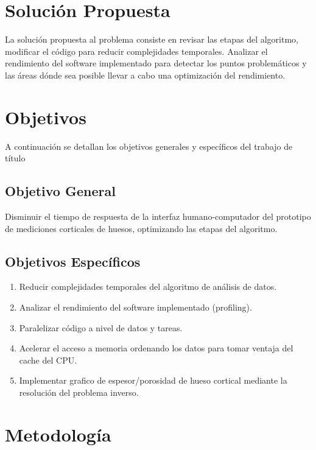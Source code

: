\section{Solución Propuesta}

La solución propuesta al problema consiste en revisar las etapas del algoritmo, modificar el código para reducir complejidades temporales.
Analizar el rendimiento del software implementado para detectar los puntos problemáticos y las áreas dónde sea posible llevar a cabo una optimización del rendimiento.

\section{Objetivos}
A continuación se detallan los objetivos generales y específicos del trabajo de título

\subsection{Objetivo General}
\label{sc:OG}
Disminuir el tiempo de respuesta de la interfaz humano-computador del prototipo
de mediciones corticales de huesos, optimizando las etapas del algoritmo.


\subsection{Objetivos Específicos}
\label{ssc:OE}
\begin{enumerate}
	\item Reducir complejidades temporales del algoritmo de análisis de datos.
	\item Analizar el rendimiento del software implementado (profiling).
	\item Paralelizar código a nivel de datos y tareas.
	\item Acelerar el acceso a memoria ordenando los datos para tomar ventaja del cache del CPU.
    \item Implementar grafico de espesor/porosidad de hueso cortical mediante la resolución del problema inverso.
\end{enumerate}



\section{Metodología}
\label{sc:Met}

